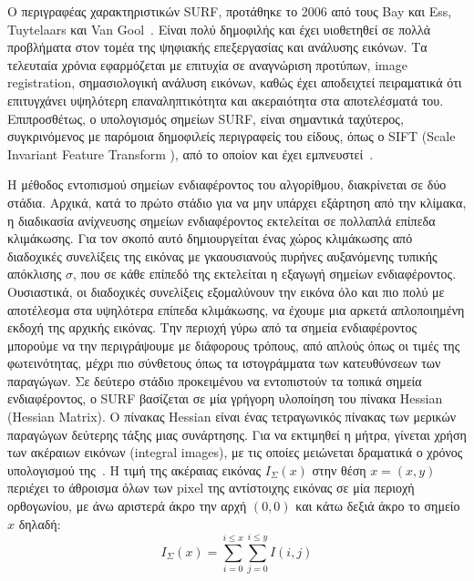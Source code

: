 Ο περιγραφέας χαρακτηριστικών SURF, προτάθηκε το 2006 από τους Bay και Ess, Tuytelaars 
και Van Gool~\cite{bay2006surf}.
Είναι πολύ δημοφιλής και έχει υιοθετηθεί σε πολλά προβλήματα στον τομέα της ψηφιακής επεξεργασίας και ανάλυσης εικόνων. 
Τα τελευταία χρόνια εφαρμόζεται με επιτυχία σε αναγνώριση προτύπων, image registration, σημασιολογική ανάλυση εικόνων, καθώς 
έχει αποδειχτεί πειραματικά ότι επιτυγχάνει υψηλότερη επαναληπτικότητα και ακεραιότητα στα αποτελέσματά του. Επιπροσθέτως, 
ο υπολογισμός σημείων SURF, είναι σημαντικά ταχύτερος, συγκρινόμενος με παρόμοια δημοφιλείς περιγραφείς του είδους, όπως ο SIFT (Scale Invariant Feature Transform ),
από το οποίον και έχει εμπνευστεί~\cite{lowe1999object}. \par
 Η μέθοδος εντοπισμού σημείων ενδιαφέροντος του αλγορίθμου, διακρίνεται σε δύο στάδια. Αρχικά, κατά το πρώτο στάδιο 
για να μην υπάρχει εξάρτηση από την κλίμακα, η διαδικασία ανίχνευσης σημείων ενδιαφέροντος εκτελείται σε πολλαπλά επίπεδα κλιμάκωσης.
Για τον σκοπό αυτό δημιουργείται ένας χώρος κλιμάκωσης από διαδοχικές συνελίξεις της εικόνας με γκαουσιανούς πυρήνες αυξανόμενης τυπικής απόκλισης $\sigma$, που σε κάθε επίπεδό της 
εκτελείται η εξαγωγή σημείων ενδιαφέροντος. Ουσιαστικά, οι διαδοχικές συνελίξεις εξομαλύνουν την εικόνα όλο και πιο πολύ 
με αποτέλεσμα στα υψηλότερα επίπεδα κλιμάκωσης, να έχουμε μια αρκετά απλοποιημένη εκδοχή της αρχικής εικόνας. 
Την περιοχή γύρω από τα σημεία ενδιαφέροντος μπορούμε να την περιγράψουμε με διάφορους τρόπους, από απλούς όπως οι τιμές της φωτεινότητας, μέχρι πιο σύνθετους
όπως τα ιστογράμματα των κατευθύνσεων των παραγώγων. 
Σε δεύτερο στάδιο προκειμένου να εντοπιστούν τα τοπικά σημεία ενδιαφέροντος, ο SURF βασίζεται σε μία γρήγορη υλοποίηση του πίνακα Ηessian (Hessian Matrix). Ο πίνακας Hessian είναι ένας τετραγωνικός
πίνακας των μερικών παραγώγων δεύτερης τάξης μιας συνάρτησης. Για να εκτιμηθεί η μήτρα, γίνεται χρήση των ακέραιων εικόνων (integral images), 
με τις οποίες μειώνεται δραματικά ο χρόνος υπολογισμού της~\cite{viola2001rapid}.
Η τιμή της ακέραιας εικόνας $I_{Σ}(x)$ στην θέση $x=(x,y)$ περιέχει το άθροισμα όλων των pixel της αντίστοιχης εικόνας σε μία περιοχή ορθογωνίου, με άνω αριστερά άκρο
την αρχή $(0,0)$ και κάτω δεξιά άκρο το σημείο $x$ δηλαδή:\\

   \begin{equation}
     I_{\Sigma}(x) = \sum_{i=0}^{i\leq x} \sum_{j=0}^{i\leq y} I(i,j) 
     \end{equation}


